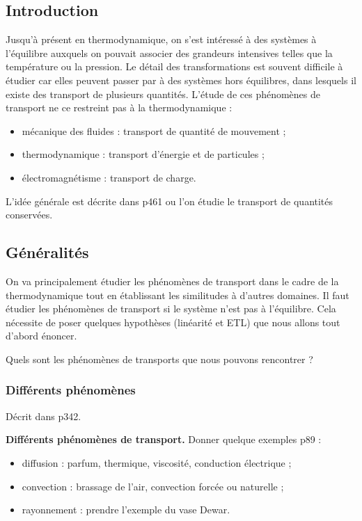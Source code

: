 \subsection*{Introduction}

Jusqu'à présent en thermodynamique, on s'est intéressé à des systèmes à l'équilibre auxquels on pouvait associer des grandeurs intensives telles que la température ou la pression.
Le détail des transformations est souvent difficile à étudier car elles peuvent passer par à des systèmes hors équilibres, dans lesquels il existe des transport de plusieurs quantités.
L'étude de ces phénomènes de transport ne ce restreint pas à la thermodynamique :
\begin{itemize}
\item mécanique des fluides : transport de quantité de mouvement ;
\item thermodynamique : transport d'énergie et de particules ;
\item électromagnétisme : transport de charge.
\end{itemize}

L'idée générale est décrite dans \cite{Diu2008} p461 ou l'on étudie le transport de quantités conservées.

\subsection{Généralités}

On va principalement étudier les phénomènes de transport dans le cadre de la thermodynamique tout en établissant les similitudes à d'autres domaines.
Il faut étudier les phénomènes de transport si le système n'est pas à l'équilibre.
Cela nécessite de poser quelques hypothèses (linéarité et ETL) que nous allons tout d'abord énoncer.

\begin{transition}
Quels sont les phénomènes de transports que nous pouvons rencontrer ?
\end{transition}

\subsubsection{Différents phénomènes}

Décrit dans \cite{Olivier2000} p342.
\begin{slide}
\textbf{Différents phénomènes de transport.}
Donner quelque exemples \cite{Sanz2016} p89 :
\begin{itemize}
\item diffusion : parfum, thermique, viscosité, conduction électrique ;
\item convection : brassage de l'air, convection forcée ou naturelle ;
\item rayonnement : prendre l'exemple du vase Dewar.
\end{itemize}
\end{slide}

